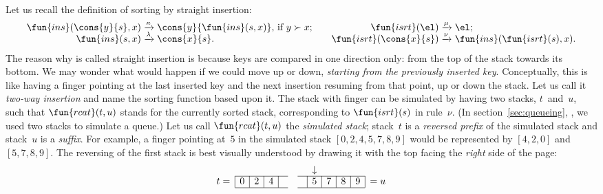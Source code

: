 Let us recall the definition of sorting by straight insertion:
\begin{equation*}
\begin{array}{@{}r@{\;}l@{\;}l@{\qquad}r@{\;}l@{\;}l@{}}
  \fun{ins}(\cons{y}{s},x)
& \xrightarrow{\smash{\kappa}}
& \cons{y}{\fun{ins}(s,x)}, \,\text{if \(y \succ x\)};
& \fun{isrt}(\el)
& \xrightarrow{\smash{\mu}}
& \el;\\
  \fun{ins}(s,x)
& \xrightarrow{\smash{\lambda}}
& \cons{x}{s}.
& \fun{isrt}(\cons{x}{s})
& \xrightarrow{\smash{\nu}}
& \fun{ins}(\fun{isrt}(s),x).
\end{array}
\end{equation*}
The reason why  is called straight
insertion is because keys are compared in one direction only: from the
top of the stack towards its bottom. We may wonder what would happen
if we could move up or down, \emph{starting from the previously
  inserted key}. Conceptually, this is like having a finger pointing
at the last inserted key and the next insertion resuming from that
point, up or down the stack. Let us call it \emph{two\hyp{}way
  insertion} and name  the sorting
function based upon it. The stack with finger can be simulated by
having two stacks, \(t\)~and~\(u\), such that
\(\fun{rcat}(t,u)\) stands for the currently
sorted stack, corresponding to
\(\fun{isrt}(s)\) in rule~\(\nu\). (In
section~\ref{sec:queueing}, , we used two
stacks to simulate a queue.) Let us call
\(\fun{rcat}(t,u)\) the \emph{simulated
  stack}; stack~\(t\) is a
\emph{reversed prefix} of the simulated
stack and stack~\(u\) is a \emph{suffix}. For
example, a finger pointing at~\(5\) in the simulated stack
\([0,2,4,5,7,8,9]\) would be represented by \([4,2,0]\) and
\([5,7,8,9]\). The reversing of the first stack is best visually
understood by drawing it with the top facing the \emph{right} side of
the page:
\begin{equation*}
\abovedisplayskip=0pt
\begin{array}{@{}r|c|c|c|ccc|c|c|c|c|l@{}}
  \multicolumn{1}{c}{} & \multicolumn{1}{c}{} & \multicolumn{1}{c}{}
& \multicolumn{1}{c}{} & \multicolumn{1}{c}{} & \multicolumn{1}{c}{}
& \multicolumn{1}{c}{} & \multicolumn{1}{c}{\downarrow}\\
\cline{2-5}\cline{7-11}
t = & 0 & 2 & 4 & & & & 5 & 7 & 8 & 9 & = u\\
\cline{2-5}\cline{7-11}
\end{array}
\end{equation*}
